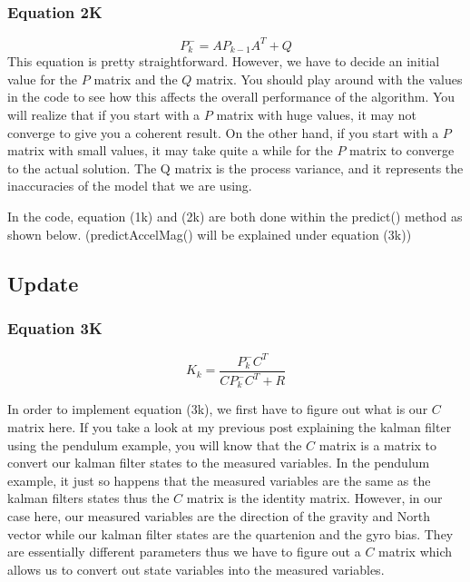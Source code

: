 \documentclass[a4paper,12pt]{book}
\begin{document}
\subsubsection{Equation 2K}

\begin{equation}
    P^-_k=AP_{k-1}A^T+Q
\end{equation}
This equation is pretty straightforward. However, we have to decide an initial value for the $P$ matrix and the $Q$ matrix. You should play around with the values in the code to see how this affects the overall performance of the algorithm. You will realize that if you start with a $P$ matrix with huge values, it may not converge to give you a coherent result. On the other hand, if you start with a $P$ matrix with small values, it may take quite a while for the $P$ matrix to converge to the actual solution. The Q matrix is the process variance, and it represents the inaccuracies of the model that we are using.

In the code, equation (1k) and (2k) are both done within the predict() method as shown below. (predictAccelMag() will be explained under equation (3k))

\subsection{Update}

\subsubsection{Equation 3K}

\begin{equation}
    K_k=\frac{P^-_kC^T}{CP^-_kC^T+R}
\end{equation}

In order to implement equation (3k), we first have to figure out what is our $C$ matrix here. If you take a look at my previous post explaining the kalman filter using the pendulum example, you will know that the $C$ matrix is a matrix to convert our kalman filter states to the measured variables. In the pendulum example, it just so happens that the measured variables are the same as the kalman filters states thus the $C$ matrix is the identity matrix. However, in our case here, our measured variables are the direction of the gravity and North vector while our kalman filter states are the quartenion and the gyro bias. They are essentially different parameters thus we have to figure out a $C$ matrix which allows us to convert out state variables into the measured variables.
\end{document}
